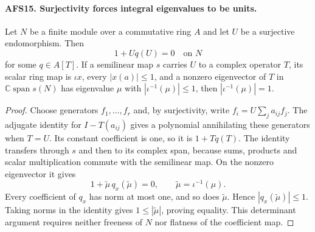 \documentclass[11pt,a4paper]{article}
\numberwithin{equation}{section}
\theoremstyle{remark}\newtheorem{remark}[theorem]{Remark}
\begin{document}
\paragraph{AFS15. Surjectivity forces integral eigenvalues to be units.}
\label{claim:AFS15}
Let $N$ be a finite module over a commutative ring $A$ and
let $U$ be a surjective endomorphism.  Then
\[
                  1+Uq(U)=0\quad\text{on }N
\]
for some $q\in A[T]$.  If a semilinear map $s$ carries $U$
to a complex operator $T$, its scalar ring map is
$\iota x$, every $|x(a)|\leq1$, and a nonzero eigenvector
of $T$ in $\mathbb C\operatorname{span}s(N)$ has eigenvalue
$\mu$ with $|\iota^{-1}(\mu)|\leq1$, then
$|\iota^{-1}(\mu)|=1$.
\begin{proof}
Choose generators $f_1,\ldots,f_r$ and, by surjectivity,
write $f_i=U\sum_ja_{ij}f_j$.  The adjugate identity for
$I-T(a_{ij})$ gives a polynomial annihilating these
generators when $T=U$.  Its constant coefficient is one,
so it is $1+Tq(T)$.  The identity transfers through $s$
and then to its complex span, because sums, products and
scalar multiplication commute with the semilinear map.
On the nonzero eigenvector it gives
\[
  1+\widetilde\mu\,q_x(\widetilde\mu)=0,
              \qquad\widetilde\mu=\iota^{-1}(\mu).
\]
Every coefficient of $q_x$ has norm at most one, and so
does $\widetilde\mu$.  Hence $|q_x(\widetilde\mu)|\leq1$.
Taking norms in the identity gives
$1\leq|\widetilde\mu|$, proving equality.  This determinant
argument requires neither freeness of $N$ nor flatness
of the coefficient map.
\end{proof}

\end{document}
